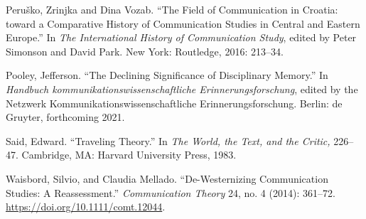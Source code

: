 \documentclass{tufte-handout}
\begin{document}
\begin{hangparas}{.25in}{1}
Peruško, Zrinjka and Dina Vozab. ``The Field of Communication in
Croatia: toward a Comparative History of Communication Studies in
Central and Eastern Europe.'' In \emph{The International History of
Communication Study}, edited by Peter Simonson and David Park. New York:
Routledge, 2016: 213--34.

Pooley, Jefferson. ``The Declining Significance of Disciplinary
Memory.'' In \emph{Handbuch kommunikationswissenschaftliche
Erinnerungsforschung}, edited by the Netzwerk
Kommunikationswissenschaftliche Erinnerungsforschung. Berlin: de
Gruyter, forthcoming 2021.

Said, Edward. ``Traveling Theory.'' In \emph{The World, the Text, and
the Critic,} 226--47. Cambridge, MA: Harvard University Press, 1983.

Waisbord, Silvio, and Claudia Mellado. ``De-Westernizing Communication
Studies: A Reassessment.'' \emph{Communication Theory} 24, no. 4 (2014):
361--72. \url{https://doi.org/10.1111/comt.12044}.



\end{hangparas}
\end{document}
